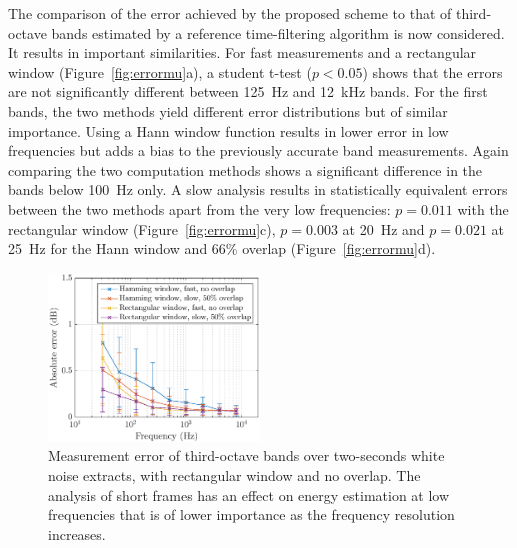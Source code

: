 \documentclass[sensors,article,submit,moreauthors,pdftex,10pt,a4paper]{mdpi}
\begin{document}
The comparison of the error achieved by the proposed scheme to that of third-octave bands estimated by a reference time-filtering algorithm is now considered. It results in important similarities. For fast measurements and a rectangular window (Figure~\ref{fig:errormu}a), a student t-test ($p<0.05$) shows that the errors are not significantly different between 125~Hz and 12~kHz bands. For the first bands, the two methods yield different error distributions but of similar importance. Using a Hann window function results in lower error in low frequencies but adds a bias to the previously accurate band measurements. Again comparing the two computation methods shows a significant difference in the bands below 100~Hz only. A slow analysis results in statistically equivalent errors between the two methods apart from the very low frequencies: $p = 0.011$ with the rectangular window (Figure~\ref{fig:errormu}c), $p = 0.003$ at 20~Hz and $p = 0.021$ at 25~Hz for the Hann window and 66\% overlap (Figure~\ref{fig:errormu}d).\\

\begin{figure}[h!]
    \centering
    \includegraphics[width=0.5\textwidth]{figures/err_m_n.eps}
    \caption{Measurement error of third-octave bands over two-seconds white noise extracts, with rectangular window and no overlap. The analysis of short frames has an effect on energy estimation at low frequencies that is of lower importance as the frequency resolution increases.\label{fig:errormn}}
\end{figure}
\end{document}
